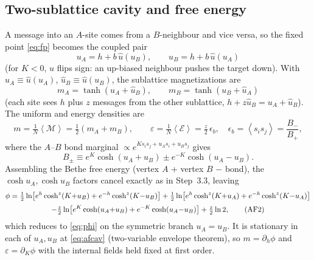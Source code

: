 \documentclass[11pt]{article}
\newcommand{\eq}{\mathcal{E}}
\newcommand{\mg}{\mathcal{M}}
\newcommand{\avg}[1]{\left\langle #1 \right\rangle}
\begin{document}
\subsection{Two-sublattice cavity and free energy}
A message into an $A$-site comes from a $B$-neighbour and vice versa, so the fixed point
\eqref{eq:fp} becomes the coupled pair
\begin{equation}
\boxed{\;u_A=h+b\,\hat u(u_B),\qquad u_B=h+b\,\hat u(u_A)\;}
\tag{AF1}\label{eq:afcav}
\end{equation}
(for $K<0$, $\hat u$ flips sign: an up-biased neighbour pushes the target down). With
$\hat u_A\equiv\hat u(u_A)$, $\hat u_B\equiv\hat u(u_B)$, the sublattice magnetizations are
\begin{equation}
m_A=\tanh(u_A+\hat u_B),\qquad m_B=\tanh(u_B+\hat u_A)
\end{equation}
(each site sees $h$ plus $z$ messages from the other sublattice, $h+z\hat u_B=u_A+\hat u_B$). The
uniform and energy densities are
\begin{equation}
m=\tfrac1N\avg{\mg}=\tfrac12(m_A+m_B),\qquad
\varepsilon=\tfrac1N\avg{\eq}=\tfrac z2\,\epsilon_b,\quad
\epsilon_b=\avg{s_is_j}=\frac{B_-}{B_+},
\end{equation}
where the $A$--$B$ bond marginal $\propto e^{Ks_is_j+u_As_i+u_Bs_j}$ gives
\begin{equation}
B_\pm\equiv e^{K}\cosh(u_A{+}u_B)\pm e^{-K}\cosh(u_A{-}u_B).
\end{equation}
Assembling the Bethe free energy (vertex $A$ + vertex $B$ $-$ bond), the $\cosh u_A,\cosh u_B$ factors
cancel exactly as in Step~3.3, leaving
\begin{gather}
\phi=\tfrac12\ln\!\big[e^{h}\cosh^z(K{+}u_B)+e^{-h}\cosh^z(K{-}u_B)\big]
+\tfrac12\ln\!\big[e^{h}\cosh^z(K{+}u_A)+e^{-h}\cosh^z(K{-}u_A)\big]\notag\\[2pt]
-\tfrac z2\ln\!\big[e^{K}\cosh(u_A{+}u_B)+e^{-K}\cosh(u_A{-}u_B)\big]+\tfrac z2\ln2,
\tag{AF2}\label{eq:afphi}
\end{gather}
which reduces to \eqref{eq:phi} on the symmetric branch $u_A=u_B$. It is stationary in each of
$u_A,u_B$ at \eqref{eq:afcav} (two-variable envelope theorem), so $m=\partial_h\phi$ and
$\varepsilon=\partial_K\phi$ with the internal fields held fixed at first order.
\end{document}
